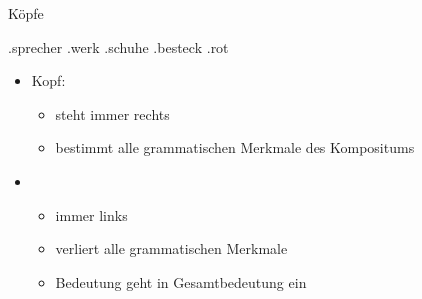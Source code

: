 \begin{frame}
  {Köpfe}
  \begin{exe}
    \ex
    \begin{xlist}
      \ex {}.\alert<10->{sprecher} 
      \ex {}.\alert<11->{werk} 
      \ex {}.\alert<12->{schuhe} 
      \ex {}.\alert<13->{besteck} 
      \ex {}.\alert<14->{rot} 
    \end{xlist}
  \end{exe}
  \begin{itemize}
    \item \alert{Kopf}:
      \begin{itemize}
        \item steht immer rechts
        \item bestimmt alle grammatischen Merkmale des Kompositums
      \end{itemize}
      \Halbzeile
    \item {}
      \begin{itemize}
        \item immer links
        \item verliert alle grammatischen Merkmale
        \item Bedeutung geht in Gesamtbedeutung ein
      \end{itemize}
  \end{itemize}
\end{frame}

